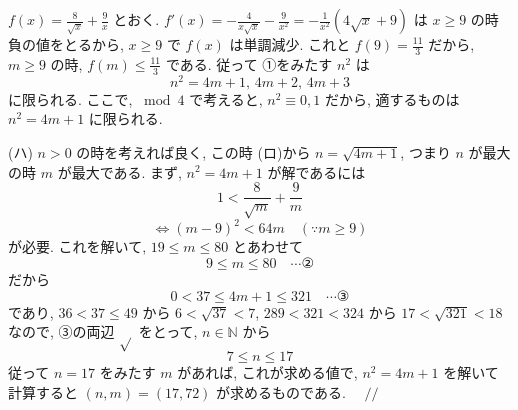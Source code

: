 \documentclass[../main.tex]{subfiles}
\begin{document}
\noindent
$f(x) = \frac{8}{\sqrt{x}} + \frac{9}{x}$ とおく. $f'(x) = -\frac{4}{x\sqrt{x}} - \frac{9}{x^2} = -\frac{1}{x^2}(4\sqrt{x}+9)$ は $x \ge 9$ の時負の値をとるから, $x \ge 9$ で $f(x)$ は単調減少. これと $f(9) = \frac{11}{3}$ だから, $m \ge 9$ の時, $f(m) \le \frac{11}{3}$ である. 従って ①をみたす $n^2$ は
\[
  n^2 = 4m+1, \, 4m+2, \, 4m+3
\]
に限られる. ここで, $\bmod 4$ で考えると, $n^2 \equiv 0, 1$ だから, 適するものは $n^2 = 4m+1$ に限られる.

\bigskip
\noindent
(ハ) $n>0$ の時を考えれば良く, この時 (ロ)から $n = \sqrt{4m+1}$, つまり $n$ が最大の時 $m$ が最大である. まず, $n^2 = 4m+1$ が解であるには
\[
  1 < \frac{8}{\sqrt{m}} + \frac{9}{m}
\]
\[
  \Leftrightarrow (m-9)^2 < 64m \quad (\because m \ge 9)
\]
が必要. これを解いて, $19 \le m \le 80$ とあわせて
\[
  9 \le m \le 80 \quad \cdots \text{②}
\]
だから
\[
  0 < 37 \le 4m+1 \le 321 \quad \cdots \text{③}
\]
であり, $36 < 37 \le 49$ から $6 < \sqrt{37} < 7$, $289 < 321 < 324$ から $17 < \sqrt{321} < 18$
なので, ③の両辺 $\sqrt{}$ をとって, $n \in \mathbb{N}$ から
\[
  7 \le n \le 17
\]
従って $n=17$ をみたす $m$ があれば, これが求める値で, $n^2 = 4m+1$ を解いて計算すると $(n, m) = (17, 72)$ が求めるものである. $\quad /\!/$
\end{document}
